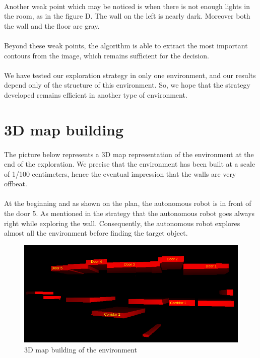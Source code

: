 \documentclass[12pt]{report}
\begin{document}
	\paragraph{}
	Another weak point which may be noticed is when there is not enough lights in the room, as in the figure D. The wall on the left is nearly dark. Moreover both the wall and the floor are gray.
	
	\paragraph{}
	Beyond these weak points, the algorithm is able to extract the most important contours from the image, which remains sufficient for the decision. 
	\paragraph{}
	We have tested our exploration strategy in only one environment, and our results depend only of the structure of this environment. So, we hope that the strategy developed remains efficient in another type of environment.
	
	\section{3D map building}
	\paragraph{}
	The picture below represents a 3D map representation of the environment at the end of the exploration. We precise that the environment has been built at a scale of 1/100 centimeters, hence the eventual impression that the walls are very offbeat.
	\paragraph{}
	At the beginning and as shown on the plan, the autonomous robot is in front of the door 5. As mentioned in the strategy that the autonomous robot goes always right while exploring the wall. Consequently, the autonomous robot explores almost all the environment before finding the target object.
	\begin{figure}[H]
		\begin{center}
			\includegraphics[scale=0.90]{res/3D_recons.png}
			\caption{3D map building of the environment}
		\end{center}
	\end{figure}
	
\end{document}
